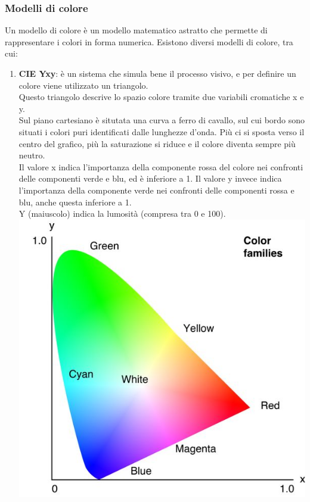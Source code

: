 \documentclass{article}
\begin{document}
\subsubsection{Modelli di colore}
Un modello di colore è un modello matematico astratto che permette di rappresentare i colori in forma numerica. Esistono diversi modelli di colore, tra cui:
\begin{enumerate}
\item \textbf{CIE Yxy}: è un sistema che simula bene il processo visivo, e per definire un colore viene utilizzato un triangolo.\\
Questo triangolo descrive lo spazio colore tramite due variabili cromatiche x e y. \\
Sul piano cartesiano è situtata una curva a ferro di cavallo, sul cui bordo sono situati i colori puri identificati dalle lunghezze d'onda. Più ci si sposta verso il centro del grafico, più la saturazione si riduce e il colore diventa sempre più neutro.\\
Il valore x indica l'importanza della componente rossa del colore nei confronti delle componenti verde e blu, ed è inferiore a 1. Il valore y invece indica l'importanza della componente verde nei confronti delle componenti rossa e blu, anche questa inferiore a 1.\\
Y (maiuscolo) indica la lumosità (compresa tra 0 e 100).\\
\includegraphics[scale=0.5]{cieYxy}

\end{enumerate}
\end{document}
